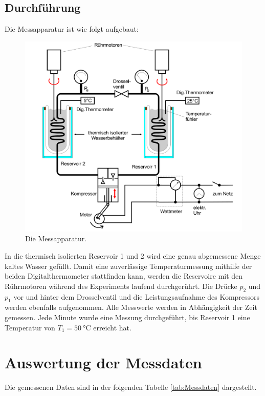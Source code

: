 \documentclass{scrartcl} %
\begin{document}
    \subsection{Durchführung}
      Die Messapparatur ist wie folgt aufgebaut:
      \begin{figure}
        \centering
        \includegraphics[scale = 0.13]{AufbauMessreihe.png}
        \caption{Die Messapparatur.}
        \label{fig:wärmepumpe2}
      \end{figure}
      In die thermisch isolierten Reservoir 1 und 2 wird eine genau abgemessene Menge kaltes Wasser gefüllt. Damit eine zuverlässige Temperaturmessung mithilfe der beiden
      Digitalthermometer stattfinden kann, werden die Reservoire mit den Rührmotoren während des Experiments laufend durchgerührt. Die Drücke $p_\text{2}$ und $p_\text{1}$
      vor und hinter dem Drosselventil und die Leistungsaufnahme des Kompressors werden ebenfalls aufgenommen. Alle Messwerte werden in Abhängigkeit der Zeit gemessen.
      Jede Minute wurde eine Messung durchgeführt, bis Reservoir 1 eine Temperatur von $T_\text{1} = \SI{50}{\celsius}$ erreicht hat.
\section{Auswertung der Messdaten}
Die gemessenen Daten sind in der folgenden Tabelle \ref{tab:Messdaten} dargestellt.


\end{document}
